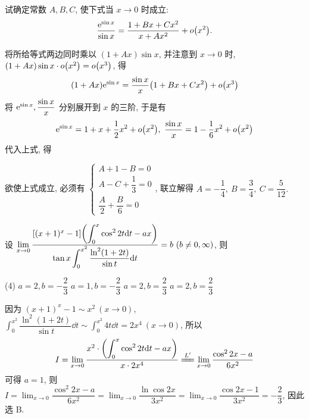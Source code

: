 \begin{example}
    试确定常数 $A,B,C$, 使下式当 $x\to0 $ 时成立:
    $$\dfrac{\mathrm{e}^{\sin x}}{\sin x}=\dfrac{1+Bx+Cx^2}{x+Ax^2}+o\qty(x^2).$$
\end{example}
\begin{solution}
    将所给等式两边同时乘以 $(1+Ax)\sin x$, 并注意到 $x\to0$ 时, $(1+Ax)\sin x\cdot o\qty(x^2)=o\qty(x^3)$, 得
    $$(1+Ax)\mathrm{e}^{\sin x}=\dfrac{\sin x}{x}\qty(1+Bx+Cx^2)+o\qty(x^3)$$
    将 $\mathrm{e}^{\sin x},\dfrac{\sin x}{x}$ 分别展开到 $x$ 的三阶, 于是有
    $$\mathrm{e}^{\sin x}=1+x+\dfrac{1}{2}x^2+o\qty(x^2),~\dfrac{\sin x}{x}=1-\dfrac{1}{6}x^2+o\qty(x^2)$$
    代入上式, 得
    欲使上式成立, 必须有 $\begin{cases}
            A+1-B=0 \\[6pt]A-C+\dfrac{1}{3}=0\\[6pt]\dfrac{A}{2}+\dfrac{B}{6}=0
        \end{cases}$, 联立解得 $A=-\dfrac{1}{4},~B=\dfrac{3}{4},~C=\dfrac{5}{12}.$
\end{solution}

\begin{example}
    设 $\displaystyle \lim_{x \to 0}\dfrac{[(x+1)^{x}-1]\qty(\displaystyle \int_{0}^{x} \cos^2 2t \dd t-ax)}{\displaystyle \tan x\int_{0}^{x^2} \dfrac{\ln^2(1+2t)}{\sin t} \dd t}=b~(b\neq 0, \infty)$, 则 
    \begin{tasks}(4)
        \task $a=2,b=-\dfrac{2}{3}$
        \task $a=1,b=-\dfrac{2}{3}$
        \task $a=2,b=\dfrac{2}{3}$
        \task $a=2,b=\dfrac{2}{3}$
    \end{tasks}
\end{example}
\begin{solution}
    因为 $(x+1)^{x}-1\sim  x^2~(x\to0)$, $\displaystyle \int_{0}^{x^2} \dfrac{\ln^2(1+2t)}{\sin t} \dd t\sim \int_{0}^{x^2} 4t \dd t=2x^4~(x\to0)$, 所以 
    $$
    I=\lim_{x \to 0}\dfrac{x^2\cdot \qty(\displaystyle \int_{0}^{x} \cos^2 2t \dd t-ax)}{x\cdot 2x^4}\xlongequal{L'}\lim_{x \to 0}\dfrac{\cos^2 2x-a}{6x^2}
    $$
    可得 $a=1$, 则 $\displaystyle I=\lim_{x \to 0}\dfrac{\cos^2 2x-a}{6x^2}=\lim_{x \to 0}\dfrac{\ln\cos 2x}{3x^2}=\lim_{x \to 0}\dfrac{\cos 2x-1}{3x^2}=-\dfrac{2}{3}$, 因此选 B.
\end{solution}

